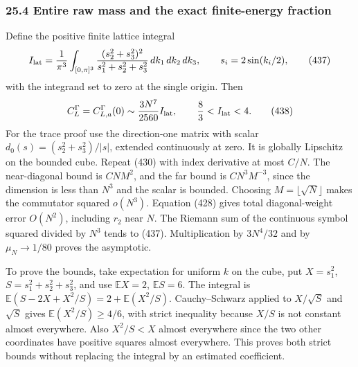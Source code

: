 \documentclass[
  11pt,
]{article}
\begin{document}
\subsubsection{25.4 Entire raw mass and the exact finite-energy
fraction}\label{entire-raw-mass-and-the-exact-finite-energy-fraction}

Define the positive finite lattice integral \[
 I_{\rm lat}=\frac1{\pi^3}\int_{[0,\pi]^3}
 \frac{(s_2^2+s_3^2)^2}{s_1^2+s_2^2+s_3^2}\,dk_1\,dk_2\,dk_3,
 \qquad s_i=2\sin(k_i/2),
 \tag{437}
\] with the integrand set to zero at the single origin. Then \[
 C_L^\Gamma=C^\Gamma_{L,a}(0)
       \sim \frac{3N^7}{2560}I_{\rm lat},\qquad
                       \frac83<I_{\rm lat}<4.
 \tag{438}
\] For the trace proof use the direction-one matrix with scalar
\(d_0(s)=(s_2^2+s_3^2)/|s|\), extended continuously at zero. It is
globally Lipschitz on the bounded cube. Repeat (430) with index
derivative at most \(C/N\). The near-diagonal bound is \(CNM^2\), and
the far bound is \(CN^3M^{-3}\), since the dimension is less than
\(N^3\) and the scalar is bounded. Choosing \(M=\lfloor\sqrt N\rfloor\)
makes the commutator squared \(o(N^3)\). Equation (428) gives total
diagonal-weight error \(O(N^2)\), including \(r_2\) near \(N\). The
Riemann sum of the continuous symbol squared divided by \(N^3\) tends to
(437). Multiplication by \(3N^4/32\) and by \(\mu_N\to1/80\) proves the
asymptotic.

To prove the bounds, take expectation for uniform \(k\) on the cube, put
\(X=s_1^2\), \(S=s_1^2+s_2^2+s_3^2\), and use \(\mathbb EX=2\),
\(\mathbb ES=6\). The integral is
\(\mathbb E(S-2X+X^2/S)=2+\mathbb E(X^2/S)\). Cauchy--Schwarz applied to
\(X/\sqrt S\) and \(\sqrt S\) gives \(\mathbb E(X^2/S)\ge 4/6\), with
strict inequality because \(X/S\) is not constant almost everywhere.
Also \(X^2/S<X\) almost everywhere since the two other coordinates have
positive squares almost everywhere. This proves both strict bounds
without replacing the integral by an estimated coefficient.
\end{document}
